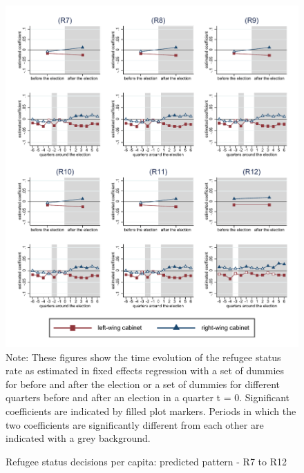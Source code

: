 \documentclass[11pt,a4paper]{scrartcl}
\begin{document}
\clearpage
\FloatBarrier


\clearpage
\FloatBarrier
\begin{figure}[!ht]
	\caption{Refugee status decisions per capita: predicted pattern - R7 to R12}
	\includegraphics[width=1\textwidth]{../results/decisions/refugeestatus_rate_graphs_R7-R12.pdf}
	\scriptsize{Note: These figures show the time evolution of the refugee status rate as estimated in fixed effects regression with a set of dummies for before and after the election or a set of dummies for different quarters before and after an election in a quarter t = 0. Significant coefficients are indicated by filled plot markers. Periods in which the two coefficients are significantly different from each other are indicated with a grey background.}
\end{figure}

%
%
%
%
%
%
%
%
\end{document}
